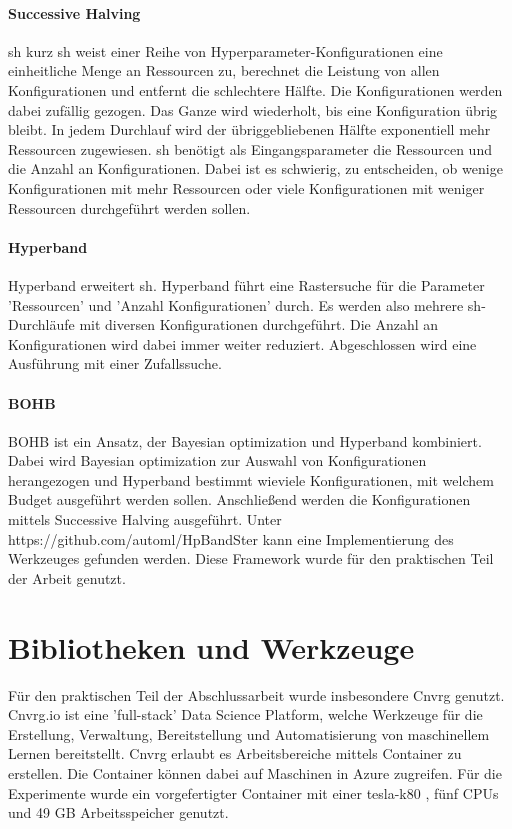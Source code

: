 	\paragraph{Successive Halving}
	\acl{sh} \cite{Jamieson.2015} kurz \ac{sh} weist einer Reihe von Hyperparameter-Konfigurationen eine einheitliche Menge an Ressourcen zu, berechnet die Leistung von allen Konfigurationen und entfernt die schlechtere Hälfte. Die Konfigurationen werden dabei zufällig gezogen. Das Ganze wird wiederholt, bis eine Konfiguration übrig bleibt. In jedem Durchlauf wird der übriggebliebenen Hälfte exponentiell mehr Ressourcen zugewiesen. \ac{sh} benötigt als Eingangsparameter die Ressourcen und die Anzahl an Konfigurationen. Dabei ist es schwierig, zu entscheiden, ob wenige Konfigurationen mit mehr Ressourcen oder viele Konfigurationen mit weniger Ressourcen durchgeführt werden sollen.
			
	\paragraph{Hyperband}	
	Hyperband \cite{Li.2017} erweitert \acl{sh}. Hyperband führt eine Rastersuche für die Parameter 'Ressourcen' und 'Anzahl Konfigurationen' durch. Es werden also mehrere \ac{sh}-Durchläufe mit diversen Konfigurationen durchgeführt. Die Anzahl an Konfigurationen wird dabei immer weiter reduziert. Abgeschlossen wird eine Ausführung mit einer Zufallssuche.
	
	\paragraph{BOHB}
	BOHB \cite{StefanFalkner.2018} ist ein Ansatz, der Bayesian optimization und Hyperband kombiniert. Dabei wird Bayesian optimization zur Auswahl von Konfigurationen herangezogen und Hyperband bestimmt wieviele Konfigurationen, mit welchem Budget ausgeführt werden sollen. Anschließend werden die Konfigurationen mittels Successive Halving ausgeführt. Unter https://github.com/automl/HpBandSter kann eine Implementierung des Werkzeuges gefunden werden. Diese Framework wurde für den praktischen Teil der Arbeit genutzt.
			
	\section{Bibliotheken und Werkzeuge}
	\label{sec:BibliothekenundWerkzeuge}
	Für den praktischen Teil der Abschlussarbeit wurde insbesondere Cnvrg \cite{Kolben.2020} genutzt. Cnvrg.io ist eine 'full-stack' Data Science Platform, welche Werkzeuge für die Erstellung, Verwaltung, Bereitstellung und Automatisierung von maschinellem Lernen bereitstellt. Cnvrg erlaubt es Arbeitsbereiche mittels Container zu erstellen. Die Container können dabei auf Maschinen in Azure \cite{MicrosoftCorporation.2020} zugreifen. Für die Experimente wurde ein vorgefertigter Container mit einer tesla-k80 \cite{Nvidia.2020}, fünf CPUs und 49 GB Arbeitsspeicher genutzt. 

